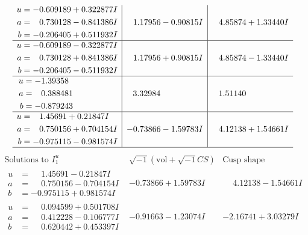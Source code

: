 \documentclass[1p]{elsarticle_modified}
\theoremstyle{definition}
\newcommand{\I}{\sqrt{-1}}
\begin{document}
$$\begin{array}{c|c|c}
\begin{aligned}
u &= -0.609189 + 0.322877 I \\
a &= \phantom{-}0.730128 - 0.841386 I \\
b &= -0.206405 + 0.511932 I\end{aligned}
 & \phantom{-}1.17956 - 0.90815 I & \phantom{-}4.85874 + 1.33440 I \\ \hline\begin{aligned}
u &= -0.609189 - 0.322877 I \\
a &= \phantom{-}0.730128 + 0.841386 I \\
b &= -0.206405 - 0.511932 I\end{aligned}
 & \phantom{-}1.17956 + 0.90815 I & \phantom{-}4.85874 - 1.33440 I \\ \hline\begin{aligned}
u &= -1.39358\phantom{ +0.000000I} \\
a &= \phantom{-}0.388481\phantom{ +0.000000I} \\
b &= -0.879243\phantom{ +0.000000I}\end{aligned}
 & \phantom{-}3.32984\phantom{ +0.000000I} & \phantom{-}1.51140\phantom{ +0.000000I} \\ \hline\begin{aligned}
u &= \phantom{-}1.45691 + 0.21847 I \\
a &= \phantom{-}0.750156 + 0.704154 I \\
b &= -0.975115 - 0.981574 I\end{aligned}
 & -0.73866 - 1.59783 I & \phantom{-}4.12138 + 1.54661 I\\
 \hline 
 \end{array}$$\newpage$$\begin{array}{c|c|c}  
\text{Solutions to }I^u_{1}& \I (\text{vol} + \sqrt{-1}CS) & \text{Cusp shape}\\
 \hline 
\begin{aligned}
u &= \phantom{-}1.45691 - 0.21847 I \\
a &= \phantom{-}0.750156 - 0.704154 I \\
b &= -0.975115 + 0.981574 I\end{aligned}
 & -0.73866 + 1.59783 I & \phantom{-}4.12138 - 1.54661 I \\ \hline\begin{aligned}
u &= \phantom{-}0.094599 + 0.501708 I \\
a &= \phantom{-}0.412228 - 0.106777 I \\
b &= \phantom{-}0.620442 + 0.453397 I\end{aligned}
 & -0.91663 - 1.23074 I & -2.16741 + 3.03279 I \\ \hline\begin{aligned}

\end{aligned}
\end{array}$$
\end{document}

